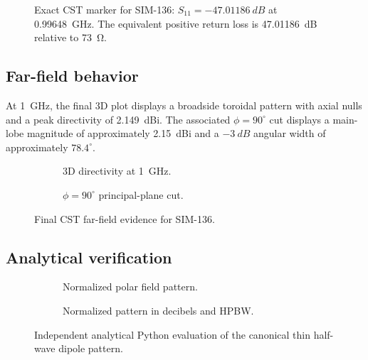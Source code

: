 \begin{figure}[H]
\centering
{}
\caption[Final tuned reflection coefficient with exact CST marker.]{Exact CST marker for SIM-136: $S_{11}=-\SI{47.01186}{dB}$ at \SI{0.99648}{GHz}. The equivalent positive return loss is \SI{47.01186}{dB} relative to \SI{73}{\ohm}.}
\label{fig:final-s11}
\end{figure}

\subsection{Far-field behavior}
At \SI{1}{GHz}, the final 3D plot displays a broadside toroidal pattern with axial nulls
and a peak directivity of \SI{2.149}{dBi}. The associated $\phi=90^\circ$ cut displays
a main-lobe magnitude of approximately \SI{2.15}{dBi} and a $-\SI{3}{dB}$ angular width
of approximately $78.4^\circ$.

\begin{figure}[H]
\centering
\begin{subfigure}[t]{0.58\textwidth}
\centering
{}
\caption{3D directivity at \SI{1}{GHz}.}
\end{subfigure}\hfill
\begin{subfigure}[t]{0.39\textwidth}
\centering
{}
\caption{$\phi=90^\circ$ principal-plane cut.}
\end{subfigure}
\caption{Final CST far-field evidence for SIM-136.}
\label{fig:final-patterns}
\end{figure}

\subsection{Analytical verification}
\begin{figure}[H]
\centering
\begin{subfigure}[t]{0.46\textwidth}
\centering
{}
\caption{Normalized polar field pattern.}
\end{subfigure}\hfill
\begin{subfigure}[t]{0.50\textwidth}
\centering
{}
\caption{Normalized pattern in decibels and HPBW.}
\end{subfigure}
\caption{Independent analytical Python evaluation of the canonical thin half-wave dipole pattern.}
\label{fig:analytical-patterns}
\end{figure}

